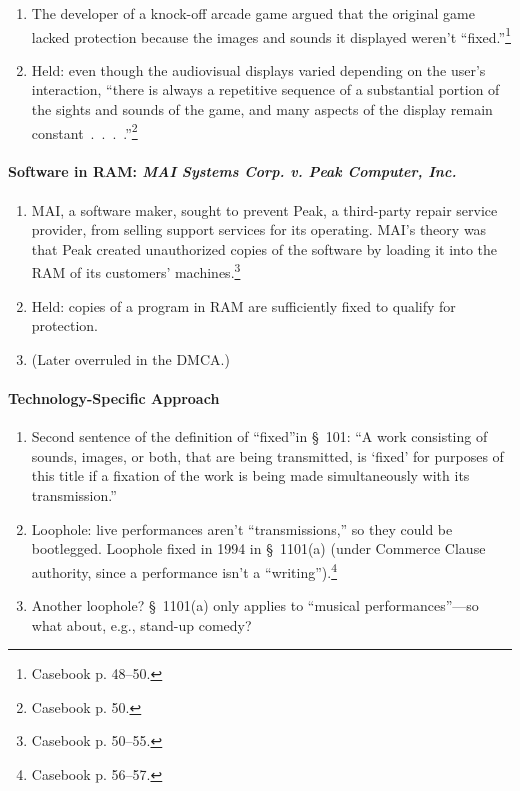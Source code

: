 \begin{enumerate}
    \item The developer of a knock-off arcade game argued that the original 
    game lacked protection because the images and sounds it displayed weren't 
    ``fixed.''\footnote{Casebook p. 48--50.}
    \item Held: even though the audiovisual displays varied depending on the 
    user's interaction, ``there is always a repetitive sequence of a 
    substantial portion of the sights and sounds of the game, and many aspects 
    of the display remain constant~.~.~.~.''\footnote{Casebook p. 50.}
\end{enumerate}

\paragraph{Software in RAM: \emph{MAI Systems Corp. v. Peak Computer, Inc.}}

\begin{enumerate}
    \item MAI, a software maker, sought to prevent Peak, a third-party repair 
    service provider, from selling support services for its operating. MAI's 
    theory was that Peak created unauthorized copies of the software by 
    loading it into the RAM of its customers' machines.\footnote{Casebook p. 
    50--55.}
    \item Held: copies of a program in RAM are sufficiently fixed to qualify 
    for protection.
    \item (Later overruled in the DMCA.)
\end{enumerate}

\paragraph{Technology-Specific Approach}

\begin{enumerate}
    \item Second sentence of the definition of ``fixed''in \S\ 101: ``A work 
    consisting of sounds, images, or both, that are being transmitted, is 
    `fixed' for purposes of this title if a fixation of the work is being made 
    simultaneously with its transmission.''
    \item Loophole: live performances aren't ``transmissions,'' so they could 
    be bootlegged. Loophole fixed in 1994 in \S\ 1101(a) (under Commerce 
    Clause authority, since a performance isn't a 
    ``writing'').\footnote{Casebook p. 56--57.}
    \item Another loophole? \S\ 1101(a) only applies to ``musical 
    performances''---so what about, e.g., stand-up comedy?
\end{enumerate}


